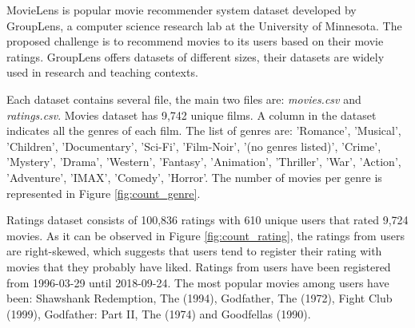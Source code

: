 \documentclass[12pt]{article}
\numberwithin{equation}{section}
\begin{document}
MovieLens is popular movie recommender system dataset developed by GroupLens, a computer science research lab at the University of Minnesota. The proposed challenge is to recommend movies to its users based on their movie ratings. GroupLens offers datasets of different sizes, their datasets are widely used in research and teaching contexts.

Each dataset contains several file, the main two files are: \textit{movies.csv} and \textit{ratings.csv}. Movies dataset has 9,742 unique films. A column in the dataset indicates all the genres of each film. The list of genres are: 'Romance', 'Musical', 'Children', 'Documentary', 'Sci-Fi', 'Film-Noir', '(no genres listed)', 'Crime', 'Mystery', 'Drama', 'Western', 'Fantasy', 'Animation', 'Thriller', 'War', 'Action', 'Adventure', 'IMAX', 'Comedy', 'Horror'. The number of movies per genre is represented in Figure \ref{fig:count_genre}.

Ratings dataset consists of 100,836 ratings with 610 unique users that rated 9,724 movies. As it can be observed in Figure \ref{fig:count_rating}, the ratings from users are right-skewed, which suggests that users tend to register their rating with movies that they probably have liked. Ratings from users have been registered from 1996-03-29 until 2018-09-24. The most popular movies among users have been: Shawshank Redemption, The (1994), Godfather, The (1972), Fight Club (1999), Godfather: Part II, The (1974) and Goodfellas (1990).
\end{document}
